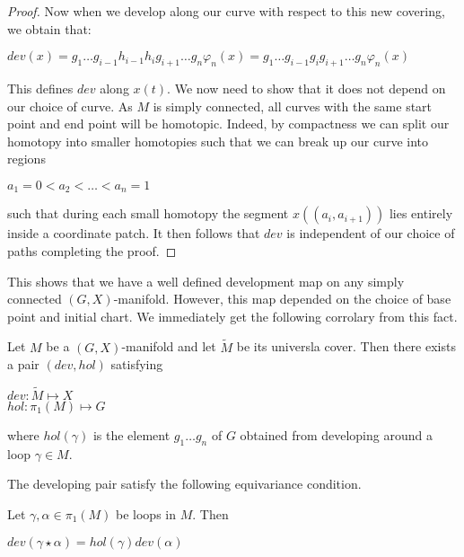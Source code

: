 \begin{proof}
    Now when we develop along our curve with respect to this new covering, we
    obtain that:

    \begin{center}
        $dev(x) = g_1 \dots g_{i-1}h_{i-1}h_{i}g_{i+1}\dots g_n\varphi_n(x) = g_1 \dots g_{i-1}g_ig_{i+1}\dots g_n\varphi_n(x)$
    \end{center}

    This defines $dev$ along $x(t)$. We now need to show that it does not depend on
    our choice of curve. As $M$ is simply connected, all curves with the same start
    point and end point will be homotopic. Indeed, by compactness we can split our
    homotopy into smaller homotopies such that we can break up our curve into
    regions
    \begin{center}
        $a_1 =0 < a_2 < \dots < a_n=1$
    \end{center}
    such that during each small homotopy the segment $x((a_i, a_{i+1}))$ lies entirely inside a coordinate patch. It then follows that $dev$ is independent of our choice of paths completing the proof.

\end{proof}

This shows that we have a well defined development map on any simply connected
$(G,X)$-manifold. However, this map depended on the choice of base point and
initial chart. We immediately get the following corrolary from this fact.

\begin{corollary}
    Let $M$ be a $(G,X)$-manifold and let $\tilde{M}$ be its universla cover. Then
    there exists a pair $(dev, hol)$ satisfying
    \begin{center}
        $dev : \tilde{M} \mapsto X$\\
        $hol: \pi_1(M) \mapsto G$
    \end{center}
    where $hol(\gamma)$ is the element $g_1\dots g_n$ of $G$ obtained from
    developing around a loop $\gamma \in M$.
\end{corollary}

The developing pair satisfy the following equivariance condition.
\begin{lemma}
    Let $\gamma, \alpha \in \pi_1(M)$ be loops in $M$. Then

    \begin{center}
        $dev(\gamma \star \alpha) = hol(\gamma)dev(\alpha)$
    \end{center}
    \label{lemma:dev-equivariance}
\end{lemma}

